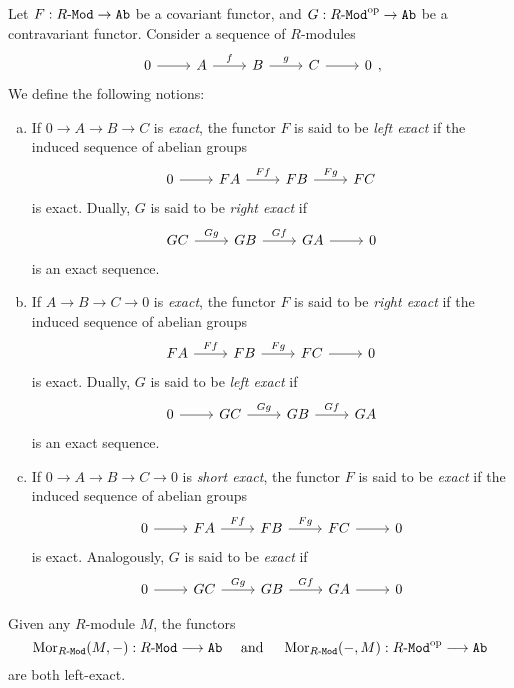 \begin{definition}
\label{def:left-exact-functor}
Let \(F: {R\text{-}\texttt{Mod}} \to {\texttt{Ab}}\) be a covariant functor, and
\(G: {R\text{-}\texttt{Mod}}^{\mathrm{op}} \to {\texttt{Ab}}\) be a contravariant functor. Consider a sequence of
\(R\)-modules
\[
\begin{tikzcd}
0 \ar[r] &A \ar[r, "f"] &B \ar[r, "g"] &C \ar[r] &0
\end{tikzcd},
\]
We define the following notions:
\begin{enumerate}[(a)]\setlength\itemsep{0em}
\item If \(0 \to A \to B \to C\) is \emph{exact}, the functor \(F\) is said to
  be \emph{left exact} if the induced sequence of abelian groups
  \[
  \begin{tikzcd}
  0 \ar[r] &F A \ar[r, "F f"] &F B \ar[r, "F g"] &F C
  \end{tikzcd}
  \]
  is exact. Dually, \(G\) is said to be \emph{right exact} if
  \[
  \begin{tikzcd}
  G C \ar[r, "G g"] &G B \ar[r, "G f"] &G A \ar[r] &0
  \end{tikzcd}
  \]
  is an exact sequence.
\item If \(A \to B \to C \to 0\) is \emph{exact}, the functor \(F\) is said to
  be \emph{right exact} if the induced sequence of abelian groups
  \[
  \begin{tikzcd}
  F A \ar[r, "F f"] &F B \ar[r, "F g"] &F C \ar[r] &0
  \end{tikzcd}
  \]
  is exact. Dually, \(G\) is said to be \emph{left exact} if
  \[
  \begin{tikzcd}
  0 \ar[r] &G C \ar[r, "G g"] &G B \ar[r, "G f"] &G A
  \end{tikzcd}
  \]
  is an exact sequence.
\item If \(0 \to A \to B \to C \to 0\) is \emph{short exact}, the functor \(F\)
  is said to be \emph{exact} if the induced sequence of abelian groups
  \[
  \begin{tikzcd}
  0 \ar[r] &F A \ar[r, "F f"] &F B \ar[r, "F g"] &F C \ar[r] &0
  \end{tikzcd}
  \]
  is exact. Analogously, \(G\) is said to be \emph{exact} if
  \[
  \begin{tikzcd}
  0 \ar[r] &G C \ar[r, "G g"] &G B \ar[r, "G f"] &G A \ar[r] &0
  \end{tikzcd}
  \]
\end{enumerate}
\end{definition}

\begin{proposition}
\label{prop:hom-functors-left-exact}
Given any \(R\)-module \(M\), the functors
\[
\operatorname{Mor}_{{R\text{-}\texttt{Mod}}}(M, -): {R\text{-}\texttt{Mod}} \longrightarrow {\texttt{Ab}}
\quad\text{ and }\quad
\operatorname{Mor}_{{R\text{-}\texttt{Mod}}}(-, M): {R\text{-}\texttt{Mod}}^{\mathrm{op}} \longrightarrow {\texttt{Ab}}
\]
are both left-exact.
\end{proposition}


